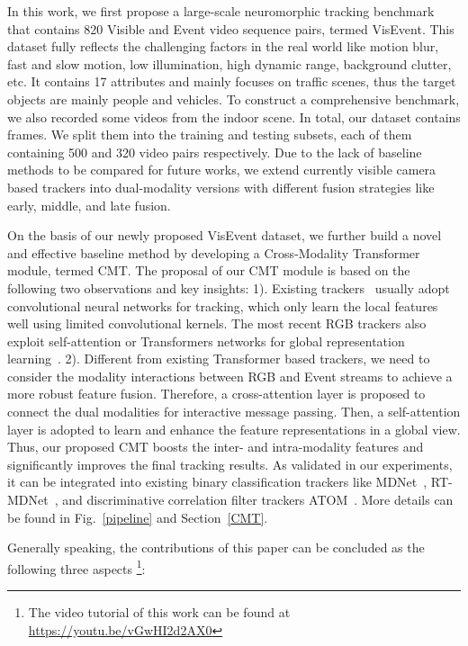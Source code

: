 \documentclass[journal]{IEEEtran}
\begin{document}
In this work, we first propose a large-scale neuromorphic tracking benchmark that contains 820 Visible and Event video sequence pairs, termed VisEvent. This dataset fully reflects the challenging factors in the real world like motion blur, fast and slow motion, low illumination, high dynamic range, background clutter, etc. It contains 17 attributes and mainly focuses on traffic scenes, thus the target objects are mainly people and vehicles. To construct a comprehensive benchmark, we also recorded some videos from the indoor scene. In total, our dataset contains  frames. We split them into the training and testing subsets, each of them containing 500 and 320 video pairs respectively. Due to the lack of baseline methods to be compared for future works, we extend currently visible camera based trackers into dual-modality versions with different fusion strategies like early, middle, and late fusion. 


On the basis of our newly proposed VisEvent dataset, we further build a novel and effective baseline method by developing a Cross-Modality Transformer module, termed CMT. 
The proposal of our CMT module is based on the following two observations and key insights: 
1). Existing trackers~\cite{Nam2015Learning, Jung_2018_ECCV, danelljan2019atom} usually adopt convolutional neural networks for tracking, which only learn the local features well using limited convolutional kernels. The most recent RGB trackers also exploit self-attention or Transformers networks for global representation learning~\cite{yan2022unificationTrack, chen2021TransT}. 
2). Different from existing Transformer based trackers, we need to consider the modality interactions between RGB and Event streams to achieve a more robust feature fusion. Therefore, a cross-attention layer is proposed to connect the dual modalities for interactive message passing. Then, a self-attention layer is adopted to learn and enhance the feature representations in a global view. Thus, our proposed CMT boosts the inter- and intra-modality features and significantly improves the final tracking results. As validated in our experiments, it can be integrated into existing binary classification trackers like MDNet~\cite{Nam2015Learning}, RT-MDNet~\cite{Jung_2018_ECCV}, and discriminative correlation filter trackers ATOM~\cite{danelljan2019atom}. More details can be found in Fig.~\ref{pipeline} and Section~\ref{CMT}. 



Generally speaking, the contributions of this paper can be concluded as the following three aspects \footnote{The video tutorial of this work can be found at \url{https://youtu.be/vGwHI2d2AX0}}:
\end{document}
